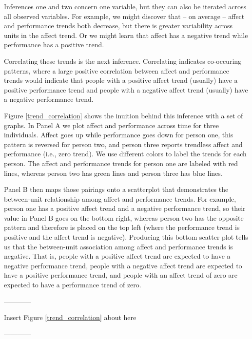 \documentclass[english,,man]{apa6}
\theoremstyle{definition}
\theoremstyle{definition}
\theoremstyle{definition}
\theoremstyle{remark}
\begin{document}
Inferences one and two concern one variable, but they can also be
iterated across all observed variables. For example, we might discover
that -- on average -- affect and performance trends both decrease, but
there is greater variability across units in the affect trend. Or we
might learn that affect has a negative trend while performance has a
positive trend.

Correlating these trends is the next inference. Correlating indicates
co-occuring patterns, where a large positive correlation between affect
and performance trends would indicate that people with a positive affect
trend (usually) have a positive performance trend and people with a
negative affect trend (usually) have a negative performance trend.

Figure \ref{trend_correlation} shows the inuition behind this inference
with a set of graphs. In Panel A we plot affect and performance across
time for three individuals. Affect goes up while performance goes down
for person one, this pattern is reversed for person two, and person
three reports trendless affect and performance (i.e., zero trend). We
use different colors to label the trends for each person. The affect and
performance trends for person one are labeled with red lines, whereas
person two has green lines and person three has blue lines.

Panel B then maps those pairings onto a scatterplot that demonstrates
the between-unit relationship among affect and performance trends. For
example, person one has a positive affect trend and a negative
performance trend, so their value in Panel B goes on the bottom right,
whereas person two has the opposite pattern and therefore is placed on
the top left (where the performance trend is positive and the affect
trend is negative). Producing this bottom scatter plot tells us that the
between-unit association among affect and performance trends is
negative. That is, people with a positive affect trend are expected to
have a negative performance trend, people with a negative affect trend
are expected to have a positive performance trend, and people with an
affect trend of zero are expected to have a performance trend of zero.

\begin{center}

------------

Insert Figure \ref{trend_correlation} about here

------------

\end{center}
\end{document}
